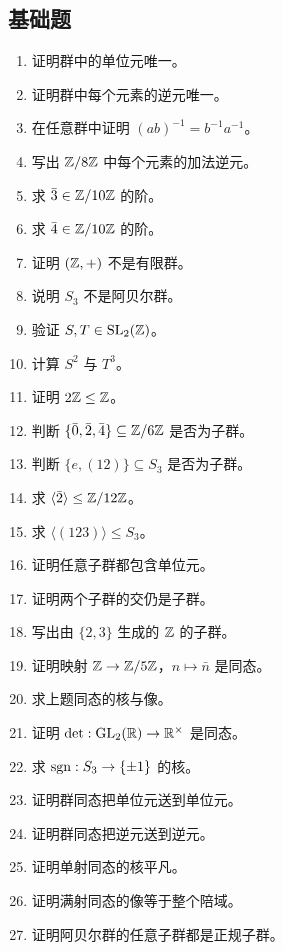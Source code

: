 \subsection*{基础题}
\begin{enumerate}[label=\textbf{\arabic*.}, leftmargin=*, itemsep=0.5em]
\item \basic 证明群中的单位元唯一。
\item \basic 证明群中每个元素的逆元唯一。
\item \basic 在任意群中证明 $(ab)^{-1}=b^{-1}a^{-1}$。
\item \basic 写出 $\mathbb{Z}/8\mathbb{Z}$ 中每个元素的加法逆元。
\item \basic 求 $\bar3\in \mathbb{Z}/10\mathbb{Z}$ 的阶。
\item \basic 求 $\bar4\in \mathbb{Z}/10\mathbb{Z}$ 的阶。
\item \basic 证明 $(\mathbb{Z},+)$ 不是有限群。
\item \basic 说明 $S_3$ 不是阿贝尔群。
\item \basic 验证 $S,T\in \mathrm{SL}_2(\mathbb{Z})$。
\item \basic 计算 $S^2$ 与 $T^3$。
\item \basic 证明 $2\mathbb{Z}\le \mathbb{Z}$。
\item \basic 判断 $\{\bar0,\bar2,\bar4\}\subseteq \mathbb{Z}/6\mathbb{Z}$ 是否为子群。
\item \basic 判断 $\{e,(12)\}\subseteq S_3$ 是否为子群。
\item \basic 求 $\langle \bar2\rangle\le \mathbb{Z}/12\mathbb{Z}$。
\item \basic 求 $\langle (123)\rangle\le S_3$。
\item \basic 证明任意子群都包含单位元。
\item \basic 证明两个子群的交仍是子群。
\item \basic 写出由 $\{2,3\}$ 生成的 $\mathbb{Z}$ 的子群。
\item \basic 证明映射 $\mathbb{Z}\to \mathbb{Z}/5\mathbb{Z}$，$n\mapsto \bar n$ 是同态。
\item \basic 求上题同态的核与像。
\item \basic 证明 $\det:\mathrm{GL}_2(\mathbb{R})\to \mathbb{R}^\times$ 是同态。
\item \basic 求 $\operatorname{sgn}:S_3\to \{\pm1\}$ 的核。
\item \basic 证明群同态把单位元送到单位元。
\item \basic 证明群同态把逆元送到逆元。
\item \basic 证明单射同态的核平凡。
\item \basic 证明满射同态的像等于整个陪域。
\item \basic 证明阿贝尔群的任意子群都是正规子群。

\end{enumerate}

